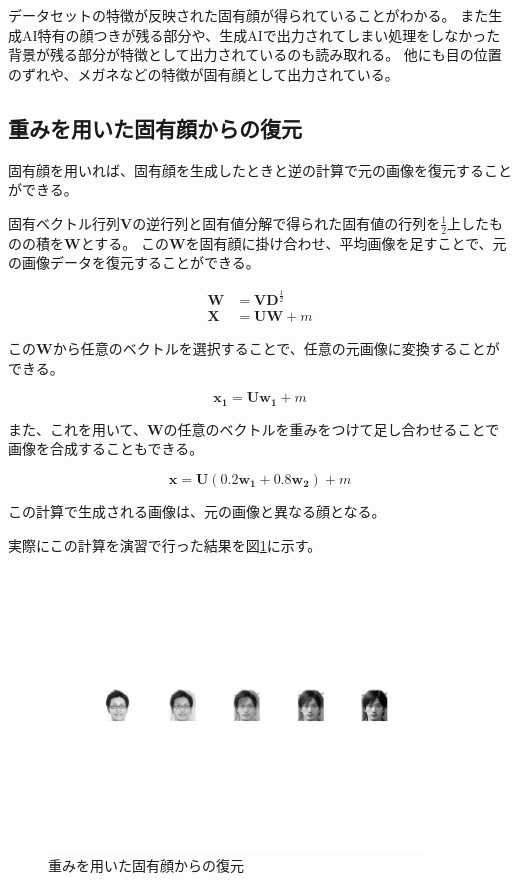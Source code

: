 \documentclass[a4paper,11pt,dvipdfmx]{jsarticle}
\begin{document}
データセットの特徴が反映された固有顔が得られていることがわかる。
また生成AI特有の顔つきが残る部分や、生成AIで出力されてしまい処理をしなかった背景が残る部分が特徴として出力されているのも読み取れる。
他にも目の位置のずれや、メガネなどの特徴が固有顔として出力されている。

\subsection{重みを用いた固有顔からの復元}
固有顔を用いれば、固有顔を生成したときと逆の計算で元の画像を復元することができる。

固有ベクトル行列$\mathbf{V}$の逆行列と固有値分解で得られた固有値の行列を$\frac{1}{2}$上したものの積を$\mathbf{W}$とする。
この$\mathbf{W}$を固有顔に掛け合わせ、平均画像を足すことで、元の画像データを復元することができる。

\begin{align}
    \mathbf{W} &= \mathbf{V} \mathbf{D}^{\frac{1}{2}} \\
    \mathbf{X} &= \mathbf{U} \mathbf{W} + m
\end{align}

この$\mathbf{W}$から任意のベクトルを選択することで、任意の元画像に変換することができる。

\begin{equation}
    \mathbf{x_1} = \mathbf{U} \mathbf{w_1} + m
\end{equation}

また、これを用いて、$\mathbf{W}$の任意のベクトルを重みをつけて足し合わせることで画像を合成することもできる。

\begin{equation}
    \mathbf{x} = \mathbf{U} (0.2\mathbf{w_1} + 0.8\mathbf{w_2}) + m
\end{equation}

この計算で生成される画像は、元の画像と異なる顔となる。

実際にこの計算を演習で行った結果を図\ref{reconstruction}に示す。

\begin{figure}[h]
\centering
\includegraphics[width=100mm]{./img/figure5.png}
\caption{重みを用いた固有顔からの復元}
\label{reconstruction}
\end{figure}
\end{document}
